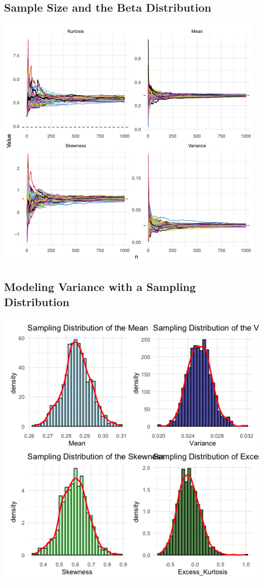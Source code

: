\documentclass{article}\usepackage[]{graphicx}\usepackage[]{xcolor}
\begin{document}
\subsection{Sample Size and the Beta Distribution}

\includegraphics[scale=0.8]{part 4.png}

\subsection{Modeling Variance with a Sampling Distribution}
\includegraphics[scale=0.8]{sampling distributions of summary stats (part 5).png}
\end{document}
